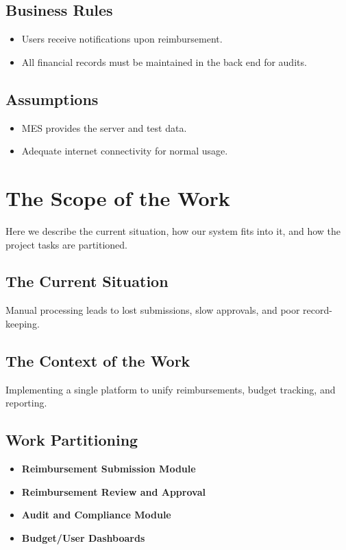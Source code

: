\documentclass[12pt]{article}
\begin{document}
\subsection{Business Rules}
\begin{itemize}
  \item Users receive notifications upon reimbursement.
  \item All financial records must be maintained in the back end for audits.
\end{itemize}

\subsection{Assumptions}
\begin{itemize}
  \item MES provides the server and test data.
  \item Adequate internet connectivity for normal usage.
\end{itemize}

\section{The Scope of the Work}
Here we describe the current situation, how our system fits into it, and how the project tasks are partitioned.

\subsection{The Current Situation}
Manual processing leads to lost submissions, slow approvals, and poor record-keeping.

\subsection{The Context of the Work}
Implementing a single platform to unify reimbursements, budget tracking, and reporting.

\subsection{Work Partitioning}
\begin{itemize}
  \item \textbf{Reimbursement Submission Module}
  \item \textbf{Reimbursement Review and Approval}
  \item \textbf{Audit and Compliance Module}
  \item \textbf{Budget/User Dashboards}
\end{itemize}
\end{document}
